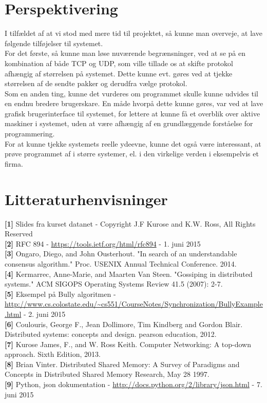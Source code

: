 \documentclass[a4paper,12pt]{article}
\begin{document}
\section{Perspektivering}
I tilfældet af at vi stod med mere tid til projektet, så kunne man overveje, at lave følgende tilføjelser til systemet.
\\
For det første, så kunne man løse nuværende begrænsninger, ved at se på en kombination af både TCP og UDP, som ville tillade os at skifte protokol afhængig af størrelsen på systemet. Dette kunne evt. gøres ved at tjekke størrelsen af de sendte pakker og derudfra vælge protokol.
\\
Som en anden ting, kunne det vurderes om programmet skulle kunne udvides til en endnu bredere brugerskare. En måde hvorpå dette kunne gøres, var ved at lave grafisk brugerinterface til systemet, for lettere at kunne få et overblik over aktive maskiner i systemet, uden at være afhængig af en grundlæggende forståelse for programmering.
\\
For at kunne tjekke systemets reelle ydeevne, kunne det også være interessant, at prøve programmet af i større systemer, el. i den virkelige verden i eksempelvis et firma.
\newpage

\section{Litteraturhenvisninger}
\textbf{[1]} Slides fra kurset datanet - Copyright J.F Kurose and K.W. Ross, All Rights Reserved
\\[5px]
\textbf{[2]} RFC 894 - \url{https://tools.ietf.org/html/rfc894} - 1. juni 2015
\\[5px]
\textbf{[3]} Ongaro, Diego, and John Ousterhout. "In search of an understandable consensus algorithm." Proc. USENIX Annual Technical Conference. 2014.
\\[5px]
\textbf{[4]} Kermarrec, Anne-Marie, and Maarten Van Steen. "Gossiping in distributed systems." ACM SIGOPS Operating Systems Review 41.5 (2007): 2-7.
\\[5px]
\textbf{[5]} Eksempel på Bully algoritmen - \url{http://www.cs.colostate.edu/~cs551/CourseNotes/Synchronization/BullyExample.html} - 2. juni 2015
\\[5px]
\textbf{[6]} Coulouris, George F., Jean Dollimore, Tim Kindberg and Gordon Blair. Distributed systems: concepts and design. pearson education, 2012.
\\[5px]
\textbf{[7]} Kurose James, F., and W. Ross Keith. Computer Networking: A top-down approach. Sixth Edition, 2013.
\\[5px]
\textbf{[8]} Brian Vinter. Distributed Shared Memory: A Survey of Paradigms and Concepts in Distributed Shared Memory Research, May 28 1997.
\\[5px]
\textbf{[9]} Python, json dokumentation - \url{http://docs.python.org/2/library/json.html} - 7. juni 2015
\end{document}
